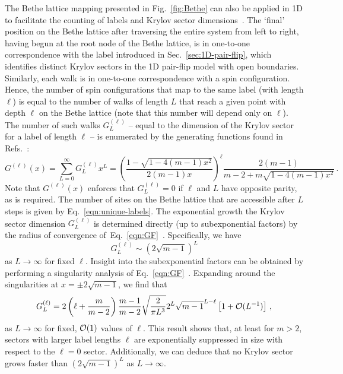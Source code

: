 The Bethe lattice mapping presented in Fig.~\ref{fig:Bethe} can also be applied in 1D to facilitate the counting of labels and Krylov sector dimensions~\cite{Caha2018PairFlip,Moudgalya2022Commutant}.
The `final' position on the Bethe lattice after traversing the entire system from left to right, having begun at the root node of the Bethe lattice, is in one-to-one correspondence with the label introduced in Sec.~\ref{sec:1D-pair-flip}, which identifies distinct Krylov sectors in the 1D pair-flip model with open boundaries. Similarly, each walk is in one-to-one correspondence with a spin configuration.
Hence, the number of spin configurations that map to the same label (with length $\ell$) is equal to the number of walks of length $L$ that reach a given point with depth $\ell$ on the Bethe lattice (note that this number will depend only on $\ell$).
The number of such walks $G_L^{(\ell)}$ -- equal to the dimension of the Krylov sector for a label of length $\ell$ -- is enumerated by the generating functions found in Refs.~\cite{Hart2020GFs,Caha2018PairFlip}: 
%
%
\begin{equation}
    G^{(\ell)}(x) = \sum_{L=0}^{\infty} G_L^{(\ell)} x^L = \left( \frac{1-\sqrt{1-4(m-1)x^2}}{2(m-1)x} \right)^\ell \frac{2(m-1)}{m-2+m\sqrt{1-4(m-1)x^2}}
    \, .
    \label{eqn:GF}
\end{equation}
%
%
Note that $G^{(\ell)}(x)$ enforces that $G_L^{(\ell)} = 0$ if $\ell$ and $L$ have opposite parity, as is required. The number of sites on the Bethe lattice that are accessible after $L$ steps is given by Eq.~\eqref{eqn:unique-labels}. The exponential growth the Krylov sector dimension $G_L^{(\ell)}$ is determined directly (up to subexponential factors) by the radius of convergence of~Eq.~\eqref{eqn:GF}~\cite{Flajolet2009Combinatorics}. Specifically, we have
%
%
\begin{equation}
    G_L^{(\ell)} \sim (2\sqrt{m-1})^L
    \label{eqn:Krylov-growth}
\end{equation}
%
%
as $L \to \infty$ for fixed $\ell$.
Insight into the subexponential factors can be obtained by performing a singularity analysis of Eq.~\eqref{eqn:GF}~\cite{Flajolet1990Singularity, Flajolet2009Combinatorics, Caha2018PairFlip}. Expanding around the singularities at $x = \pm 2\sqrt{m-1}$, we find that
%
%
\begin{equation}   
    G_L^{(\ell)} = 2\left( \ell + \frac{m}{m-2} \right) \frac{m-1}{m-2} \sqrt{\frac{2}{\pi L^3}} 2^L \sqrt{m-1}^{L-\ell} \left[ 1 + \cal{O}(L^{-1}) \right]
    \, ,
\end{equation}
%
%
as $L \to \infty$ for fixed, $\cal{O}(1)$ values of $\ell$. 
This result shows that, at least for $m > 2$, sectors with larger label lengths $\ell$ are exponentially suppressed in size with respect to the $\ell = 0$ sector.
Additionally, we can deduce that no Krylov sector grows faster than $(2\sqrt{m-1})^L$ as $L \to \infty$.

